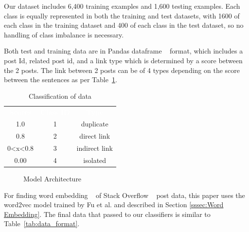 \documentclass[sigconf]{acmart}
\theoremstyle{break}
\begin{document}
    Our dataset includes 6,400 training examples and 1,600 testing examples. Each class is equally represented in both the training and test datasets, with 1600 of each class in the training dataset and 400 of each class in the test dataset, so no handling of class imbalance is necessary.
    
    Both test and training data are in Pandas dataframe ~\cite{mckinney2011pandas} format, which includes a post Id, related post id, and a link type which is determined by a score between the 2 posts. The link between 2 posts can be of 4 types depending on the score between the sentences as per Table~\ref{tab:data_classl}.
    
    \begin{table}[h!]
        \centering
        \begin{tabular}{c|c|c}
            \rowcolor{darkgray} \textcolor{white}{\textbf{Scores}} & \textcolor{white}{\textbf{Class ID}} & \textcolor{white}{\textbf{Type}} \\
            1.0 & 1 & duplicate  \\
            \rowcolor{lightgray} 0.8 & 2 & direct link \\
            0<x<0.8 & 3 & indirect link \\
            \rowcolor{lightgray} 0.00 & 4 & isolated \\
        \end{tabular}
        \caption{Classification of data}
        \label{tab:data_classl}
    \end{table}
        \begin{figure}
        \centering
        \caption{Model Architecture}
        \label{fig:our_model}
    \end{figure}
    
    
    For finding word embedding ~\cite{mikolov2013distributed} of Stack Overflow ~\cite{barua2014developers} post data, this paper uses the word2vec model trained by Fu et al. and described in Section \ref{sssec:Word Embedding}.
     The final data that     passed to our classifiers is similar to Table~\ref{tab:data_format}.
    
\end{document}

